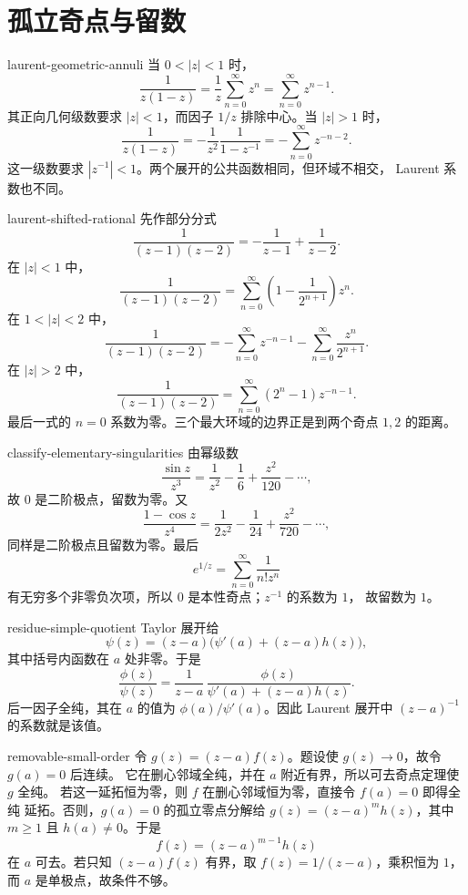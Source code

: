 \chapter{孤立奇点与留数}
\label{chap:isolated-singularities-residues-solutions}

\begin{solution}{laurent-geometric-annuli}
当 \(0<|z|<1\) 时，
\[
 \frac1{z(1-z)}
 =\frac1z\sum_{n=0}^{\infty}z^n
 =\sum_{n=0}^{\infty}z^{n-1}.
\]
其正向几何级数要求 \(|z|<1\)，而因子 \(1/z\) 排除中心。当 \(|z|>1\) 时，
\[
 \frac1{z(1-z)}
 =-\frac1{z^2}\frac1{1-z^{-1}}
 =-\sum_{n=0}^{\infty}z^{-n-2}.
\]
这一级数要求 \(|z^{-1}|<1\)。两个展开的公共函数相同，但环域不相交，
Laurent 系数也不同。
\end{solution}

\begin{solution}{laurent-shifted-rational}
先作部分分式
\[
 \frac1{(z-1)(z-2)}=-\frac1{z-1}+\frac1{z-2}.
\]
在 \(|z|<1\) 中，
\[
 \frac1{(z-1)(z-2)}
 =\sum_{n=0}^{\infty}\left(1-\frac1{2^{n+1}}\right)z^n.
\]
在 \(1<|z|<2\) 中，
\[
 \frac1{(z-1)(z-2)}
 =-\sum_{n=0}^{\infty}z^{-n-1}
   -\sum_{n=0}^{\infty}\frac{z^n}{2^{n+1}}.
\]
在 \(|z|>2\) 中，
\[
 \frac1{(z-1)(z-2)}
 =\sum_{n=0}^{\infty}(2^n-1)z^{-n-1}.
\]
最后一式的 \(n=0\) 系数为零。三个最大环域的边界正是到两个奇点
\(1,2\) 的距离。
\end{solution}

\begin{solution}{classify-elementary-singularities}
由幂级数
\[
 \frac{\sin z}{z^3}=\frac1{z^2}-\frac16+\frac{z^2}{120}-\cdots,
\]
故 \(0\) 是二阶极点，留数为零。又
\[
 \frac{1-\cos z}{z^4}
 =\frac1{2z^2}-\frac1{24}+\frac{z^2}{720}-\cdots,
\]
同样是二阶极点且留数为零。最后
\[
 e^{1/z}=\sum_{n=0}^{\infty}\frac1{n!z^n}
\]
有无穷多个非零负次项，所以 \(0\) 是本性奇点；\(z^{-1}\) 的系数为 \(1\)，
故留数为 \(1\)。
\end{solution}

\begin{solution}{residue-simple-quotient}
Taylor 展开给
\[
 \psi(z)=(z-a)\bigl(\psi'(a)+(z-a)h(z)\bigr),
\]
其中括号内函数在 \(a\) 处非零。于是
\[
 \frac{\phi(z)}{\psi(z)}
 =\frac1{z-a}\,
 \frac{\phi(z)}{\psi'(a)+(z-a)h(z)}.
\]
后一因子全纯，其在 \(a\) 的值为 \(\phi(a)/\psi'(a)\)。因此 Laurent
展开中 \((z-a)^{-1}\) 的系数就是该值。
\end{solution}

\begin{solution}{removable-small-order}
令 \(g(z)=(z-a)f(z)\)。题设使 \(g(z)\to0\)，故令 \(g(a)=0\) 后连续。
它在删心邻域全纯，并在 \(a\) 附近有界，所以可去奇点定理使 \(g\) 全纯。
若这一延拓恒为零，则 \(f\) 在删心邻域恒为零，直接令 \(f(a)=0\) 即得全纯
延拓。否则，\(g(a)=0\) 的孤立零点分解给
\(g(z)=(z-a)^mh(z)\)，其中 \(m\ge1\) 且 \(h(a)\ne0\)。于是
\[
 f(z)=(z-a)^{m-1}h(z)
\]
在 \(a\) 可去。若只知 \((z-a)f(z)\) 有界，取
\(f(z)=1/(z-a)\)，乘积恒为 \(1\)，而 \(a\) 是单极点，故条件不够。
\end{solution}

